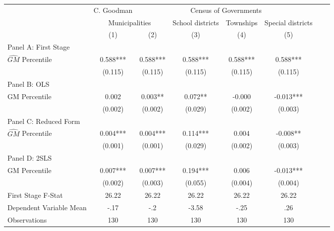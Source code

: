    \begin{tabular}{l*{7}{c}} \toprule
&\multicolumn{1}{c}{C. Goodman}&\multicolumn{4}{c}{Census of Governments}\\\cmidrule(lr){2-2}\cmidrule(lr){3-6}
&\multicolumn{2}{c}{Municipalities}&\multicolumn{1}{c}{School districts}&\multicolumn{1}{c}{Townships}&\multicolumn{1}{c}{Special districts}\\\cmidrule(lr){2-3}\cmidrule(lr){4-6}
&\multicolumn{1}{c}{(1)}&\multicolumn{1}{c}{(2)}&\multicolumn{1}{c}{(3)}&\multicolumn{1}{c}{(4)}&\multicolumn{1}{c}{(5)}\\
\cmidrule(lr){1-6}
\multicolumn{5}{l}{Panel A: First Stage}\\
\cmidrule(lr){1-6}
$\widehat{GM}$ Percentile&    0.588***&    0.588***&    0.588***&    0.588***&    0.588***\\
                &  (0.115)   &  (0.115)   &  (0.115)   &  (0.115)   &  (0.115)   \\
\cmidrule(lr){1-6}
\multicolumn{5}{l}{Panel B: OLS}\\
\cmidrule(lr){1-6}
GM Percentile   &    0.002   &    0.003** &    0.072** &   -0.000   &   -0.013***\\
                &  (0.002)   &  (0.002)   &  (0.029)   &  (0.002)   &  (0.003)   \\
\cmidrule(lr){1-6}
\multicolumn{5}{l}{Panel C: Reduced Form}\\
\cmidrule(lr){1-6}
$\widehat{GM}$ Percentile&    0.004***&    0.004***&    0.114***&    0.004   &   -0.008** \\
                &  (0.001)   &  (0.001)   &  (0.029)   &  (0.002)   &  (0.003)   \\
\cmidrule(lr){1-6}
\multicolumn{5}{l}{Panel D: 2SLS}\\
\cmidrule(lr){1-6}
GM Percentile   &    0.007***&    0.007***&    0.194***&    0.006   &   -0.013***\\
                &  (0.002)   &  (0.003)   &  (0.055)   &  (0.004)   &  (0.004)   \\
\midrule
First Stage F-Stat&    26.22   &    26.22   &    26.22   &    26.22   &    26.22   \\
Dependent Variable Mean&     -.17   &      -.2   &    -3.58   &     -.25   &      .26   \\
Observations    &      130   &      130   &      130   &      130   &      130   \\
       \bottomrule \end{tabular}
